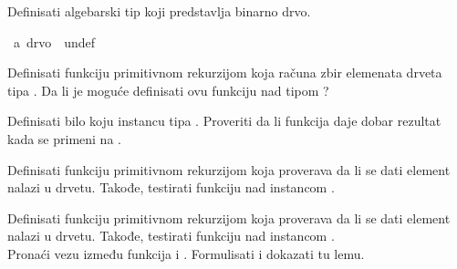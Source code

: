 %
\begin{isabellebody}%
%
%
\isadelimtheory
%
\endisadelimtheory
%
\isatagtheory
%
\endisatagtheory
{\isafoldtheory}%
%
\isadelimtheory
%
\endisadelimtheory
%
\begin{exercise}[subtitle=Tip: 'a drvo]
%
\begin{isamarkuptext}%
Definisati algebarski tip  koji predstavlja binarno drvo.%
\end{isamarkuptext}\isamarkuptrue%
\isamarkupfalse%
\ {\isacharprime}{\kern0pt}a\ drvo\ {\isacharequal}{\kern0pt}\ undef%
\begin{isamarkuptext}%
Definisati funkciju  primitivnom rekurzijom koja 
      računa zbir elemenata drveta tipa . Da li je moguće definisati ovu
      funkciju nad tipom ?%
\end{isamarkuptext}\isamarkuptrue%
%
\begin{isamarkuptext}%
Definisati bilo koju instancu  tipa . Proveriti
      da li funkcija  daje dobar rezultat kada se primeni na .%
\end{isamarkuptext}\isamarkuptrue%
%
\begin{isamarkuptext}%
Definisati funkciju  primitivnom rekurzijom koja
      proverava da li se dati element nalazi u drvetu. Takođe, testirati funkciju nad 
      instancom .%
\end{isamarkuptext}\isamarkuptrue%
%
\begin{isamarkuptext}%
Definisati funkciju  primitivnom rekurzijom koja
      proverava da li se dati element nalazi u drvetu. Takođe, testirati funkciju nad
      instancom .\\
      Pronaći vezu između funkcija  i . Formulisati i dokazati tu lemu.%
\end{isamarkuptext}\isamarkuptrue%
%
\end{exercise}

\end{isabellebody}
